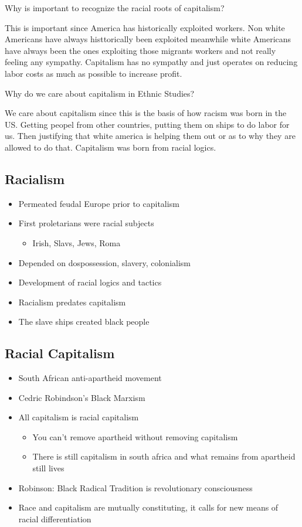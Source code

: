 \documentclass{article}
\begin{document}
Why is important to recognize the racial roots of capitalism?

This is important since America has historically exploited workers. Non white Americans
have always histtorically been exploited meanwhile white Americans have always been the ones exploiting
those migrants workers and not really feeling any sympathy. Capitalism has no sympathy and just operates on
reducing labor costs as much as possible to increase profit.

Why do we care about capitalism in Ethnic Studies?

We care about capitalism since this is the basis of how racism was born in the US.
Getting peopel from other countries, putting them on ships to do labor for us.
Then justifying that white america is helping them out or as to why they are allowed to do that.
Capitalism was born from racial logics. 

\subsection{Racialism}
\begin{itemize}
  \item Permeated feudal Europe prior to capitalism
  \item First proletarians were racial subjects
    \begin{itemize}
      \item Irish, Slavs, Jews, Roma
    \end{itemize}
  \item Depended on dospossession, slavery, colonialism
  \item Development of racial logics and tactics
  \item Racialism predates capitalism
  \item The slave ships created black people
\end{itemize}

\subsection{Racial Capitalism}
\begin{itemize}
  \item South African anti-apartheid movement
  \item Cedric Robindson's Black Marxism
  \item All capitalism is racial capitalism
    \begin{itemize}
      \item You can't remove apartheid without removing capitalism 
      \item There is still capitalism in south africa and 
        what remains from apartheid still lives
    \end{itemize}
  \item Robinson: Black Radical Tradition is revolutionary consciousness 
  \item Race and capitalism are mutually constituting,
    it calls for new means of racial differentiation
\end{itemize}
\end{document}
